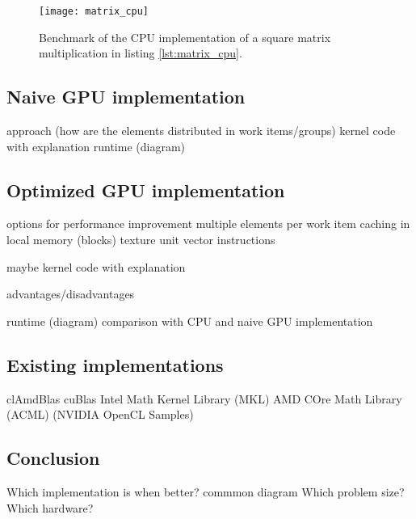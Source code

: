 



\begin{figure}
\centering
\texttt{[image: matrix\_cpu]}
\caption{Benchmark of the CPU implementation of a square matrix multiplication in listing \ref{lst:matrix_cpu}.}
\label{chart:matrix_cpu}
\end{figure}

\subsection{Naive GPU implementation}





approach (how are the elements distributed in work items/groups)
kernel code with explanation
runtime (diagram)

\subsection{Optimized GPU implementation}
options for performance improvement
multiple elements per work item
caching in local memory (blocks)
texture unit
vector instructions

maybe kernel code with explanation

advantages/disadvantages

runtime (diagram)
comparison with CPU and naive GPU implementation

\subsection{Existing implementations}
clAmdBlas
cuBlas
Intel Math Kernel Library (MKL)
AMD COre Math Library (ACML)
(NVIDIA OpenCL Samples)

\subsection{Conclusion}
Which implementation is when better?
commmon diagram
Which problem size?
Which hardware?